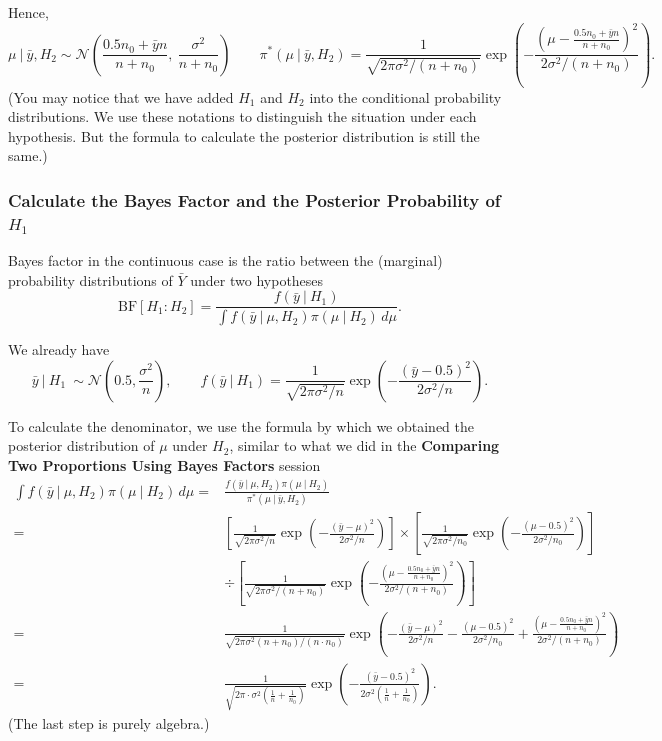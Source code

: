 \documentclass{article}
\def\dsst{\displaystyle}
\begin{document}
Hence,
$$ \mu~|~\bar{y}, H_2\sim \mathcal{N}\left(\frac{0.5n_0+\bar{y}n}{n+n_0},\ \frac{\sigma^2}{n+n_0}\right) \qquad \pi^*(\mu~|~\bar{y}, H_2) = \frac{1}{\sqrt{2\pi \sigma^2/(n+n_0)}}\exp\left(-\frac{\left(\mu - \frac{0.5n_0+\bar{y}n}{n+n_0}\right)^2}{2\sigma^2/(n+n_0)}\right). $$
(You may notice that we have added $H_1$ and $H_2$ into the conditional probability distributions. We use these notations to distinguish the situation under each hypothesis. But the formula to calculate the posterior distribution is still the same.)

\subsubsection*{Calculate the Bayes Factor and the Posterior Probability of $H_1$}

Bayes factor in the continuous case is the ratio between the (marginal) probability distributions of $\bar{Y}$ under two hypotheses
$$ \text{BF}[H_1:H_2] = \frac{f(\bar{y}~|~H_1)}{ \dsst \int f(\bar{y}~|~\mu, H_2)\pi(\mu~|~H_2)\, d\mu}. $$

We already have
$$ \bar{y}~|~H_1\ \sim  \mathcal{N}(0.5, \frac{\sigma^2}{n}), \qquad f(\bar{y}~|~H_1) = \frac{1}{\sqrt{2\pi\sigma^2/n}}\exp\left(-\frac{(\bar{y}-0.5)^2}{2\sigma^2/n}\right). $$

To calculate the denominator, we use the formula by which we obtained the posterior distribution of $\mu$ under $H_2$, similar to what we did in the \textbf{Comparing Two Proportions Using Bayes Factors} session
\begin{align*}
\int f(\bar{y}~|~\mu, H_2)\pi(\mu~|~H_2)\, d\mu = & \frac{f(\bar{y}~|~\mu, H_2)\pi(\mu~|~H_2)}{\pi^*(\mu~|~\bar{y}, H_2)} \\
= & \left[\frac{1}{\sqrt{2\pi\sigma^2/n}}\exp\left(-\frac{(\bar{y}-\mu)^2}{2\sigma^2/n}\right)\right]\times \left[\frac{1}{\sqrt{2\pi\sigma^2/n_0}}\exp\left(-\frac{(\mu - 0.5)^2}{2\sigma^2/n_0}\right)\right] \\
& \div \left[\frac{1}{\sqrt{2\pi\sigma^2/(n+n_0)}}\exp\left(-\frac{\left(\mu-\frac{0.5n_0+\bar{y}n}{n+n_0}\right)^2}{2\sigma^2/(n+n_0)}\right)\right] \\ 
= & \frac{1}{\sqrt{2\pi\sigma^2(n+n_0)/(n\cdot n_0)}}\exp\left(-\frac{(\bar{y}-\mu)^2}{2\sigma^2/n}-\frac{(\mu-0.5)^2}{2\sigma^2/n_0}+\frac{\left(\mu - \frac{0.5n_0+\bar{y}n}{n+n_0}\right)^2}{2\sigma^2/(n+n_0)}\right) \\
= & \frac{1}{\sqrt{2\pi \cdot \sigma^2\left(\frac{1}{n}+\frac{1}{n_0}\right)}}\exp\left(-\frac{(\bar{y}-0.5)^2}{2\sigma^2\left(\frac{1}{n}+\frac{1}{n_0}\right)}\right).
\end{align*} 
(The last step is purely algebra.)\\
\end{document}
